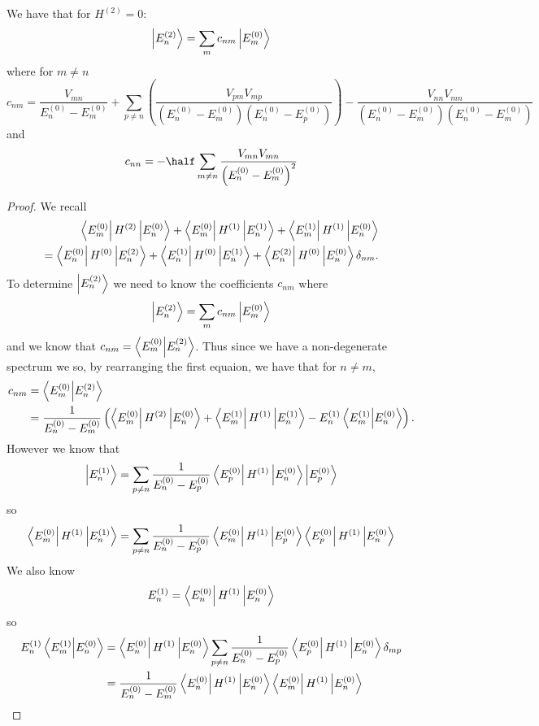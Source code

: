 \documentclass[12pt, a4paper]{article}
\begin{document}
\begin{mdprop}
    We have that for \(H^{(2)}=0\):
    \[\ket{E_n^{(2)}} = \sum_m c_{nm} \ket{E^{(0)}_m}\]
    where for \(m \neq n\)
    \[c_{nm} = \frac{V_{mn}}{E_n^{(0)}-E_m^{(0)}} +\sum_{p\neq n} \left( \frac{V_{pm}V_{mp}}{\left( E_n^{(0)}-E_m^{(0)} \right) \left( E_n^{(0)}-E_p^{(0)} \right)} \right) - \frac{V_{nn}V_{mn}}{\left( E_n^{(0)}-E_m^{(0)} \right)\left( E_n^{(0)}-E_m^{(0)} \right)}\]
    and 
    \[c_{nn} = -\half \sum_{m\neq n} \frac{V_{mn}V_{mn}}{\left( E_n^{(0)}-E_m^{(0)} \right)^2}\]
\end{mdprop}

\begin{proof}
    We recall 
    \[
    \begin{split}
        \bra{E_{m}^{(0)}} H^{(2)} \ket{E_{n}^{(0)}} + \bra{E_{m}^{(0)}} H^{(1)} \ket{E_{n}^{(1)}} + \bra{E_{m}^{(1)}} H^{(1)} \ket{E_{n}^{(0)}} \\
        = \bra{E_{n}^{(0)}} H^{(0)} \ket{E_{n}^{(2)}} + \bra{E_{n}^{(1)}} H^{(0)} \ket{E_{n}^{(1)}} + \bra{E_{n}^{(2)}} H^{(0)} \ket{E_{n}^{(0)}} \delta_{nm}.
    \end{split}\]
    To determine \(\ket{E_{n}^{(2)}}\) we need to know the coefficients \(c_{nm}\) where
    \[\ket{E_{n}^{(2)}} = \sum_{m} c_{nm} \ket{E_{m}^{(0)}}\]
    and we know that \(c_{nm} = \bra{E_{m}^{(0)}}\ket{E_{n}^{(2)}}\). Thus since we have a non-degenerate spectrum we so, by rearranging the first equaion, we have that for \(n \neq m\),
    \[\begin{aligned}
        c_{nm} &= \bra{E_{m}^{(0)}}\ket{E_{n}^{(2)}} \\
        &= \frac{1}{E_{n}^{(0)} - E_{m}^{(0)}} \left( \bra{E_{m}^{(0)}} H^{(2)} \ket{E_{n}^{(0)}} + \bra{E_{m}^{(1)}} H^{(1)} \ket{E_{n}^{(1)}} - E_{n}^{(1)}\bra{E_{m}^{(1)}}\ket{E_{n}^{(0)}} \right).
    \end{aligned}\]
However we know that
\[
\ket{E_{n}^{(1)}} = \sum_{p \neq n} \frac{1}{E_{n}^{(0)} - E_{p}^{(0)}} \bra{E_{p}^{(0)}} H^{(1)} \ket{E_{n}^{(0)}} \ket{E_{p}^{(0)}}
\]
so
\[
\bra{E_{m}^{(0)}} H^{(1)} \ket{E_{n}^{(1)}} = \sum_{p \neq n} \frac{1}{E_{n}^{(0)} - E_{p}^{(0)}} \bra{E_{m}^{(0)}} H^{(1)} \ket{E_{p}^{(0)}} \bra{E_{p}^{(0)}} H^{(1)} \ket{E_{n}^{(0)}}
\]
We also know
\[
E_{n}^{(1)} = \bra{E_{n}^{(0)}} H^{(1)} \ket{E_{n}^{(0)}}
\]
so
\[\begin{aligned}
    E_{n}^{(1)}\bra{E_{m}^{(1)}}\ket{E_{n}^{(0)}} &= \bra{E_{n}^{(0)}} H^{(1)} \ket{E_{n}^{(0)}} \sum_{p \neq n} \frac{1}{E_{n}^{(0)} - E_{p}^{(0)}} \bra{E_{p}^{(0)}} H^{(1)} \ket{E_{n}^{(0)}} \delta_{mp}\\
&= \frac{1}{E_{n}^{(0)} - E_{m}^{(0)}} \bra{E_{n}^{(0)}} H^{(1)} \ket{E_{n}^{(0)}} \bra{E_{m}^{(0)}} H^{(1)} \ket{E_{n}^{(0)}}
\end{aligned}\]


\end{proof}
\end{document}
